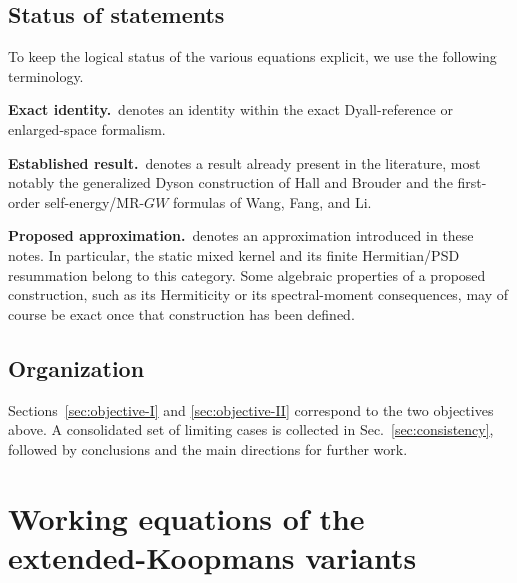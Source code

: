 \documentclass[aip,jcp,reprint,noshowkeys,superscriptaddress]{revtex4-1}
\newcommand{\Exact}{\textbf{Exact identity.}\ }
\newcommand{\Established}{\textbf{Established result.}\ }
\newcommand{\Proposed}{\textbf{Proposed approximation.}\ }
\begin{document}
\subsection{Status of statements}

To keep the logical status of the various equations explicit, we use the
following terminology.

\Exact denotes an identity within the exact Dyall-reference or enlarged-space
formalism.

\Established denotes a result already present in the literature, most notably
the generalized Dyson construction of Hall and Brouder and the first-order
self-energy/MR-$GW$ formulas of Wang, Fang, and Li.

\Proposed denotes an approximation introduced in these notes.  In particular,
the static mixed kernel and its finite Hermitian/PSD resummation belong to
this category.  Some algebraic properties of a proposed construction, such as
its Hermiticity or its spectral-moment consequences, may of course be exact
once that construction has been defined.
\subsection{Organization}

Sections~\ref{sec:objective-I} and \ref{sec:objective-II} correspond to the two
objectives above.  A consolidated set of limiting cases is collected in
Sec.~\ref{sec:consistency}, followed by conclusions and the main directions
for further work.
\section{Working equations of the extended-Koopmans variants}
\label{sec:ekt-variants}
\end{document}
